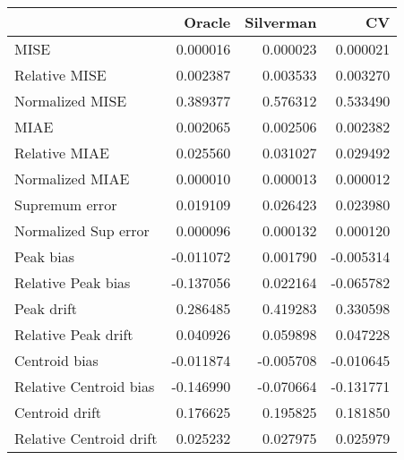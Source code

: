 \begin{tabular}{lrrr}
  \toprule
 & Oracle & Silverman & CV \\ 
  \midrule
MISE & 0.000016 & 0.000023 & 0.000021 \\ 
  Relative MISE & 0.002387 & 0.003533 & 0.003270 \\ 
  Normalized MISE & 0.389377 & 0.576312 & 0.533490 \\ 
  MIAE & 0.002065 & 0.002506 & 0.002382 \\ 
  Relative MIAE & 0.025560 & 0.031027 & 0.029492 \\ 
  Normalized MIAE & 0.000010 & 0.000013 & 0.000012 \\ 
  Supremum error & 0.019109 & 0.026423 & 0.023980 \\ 
  Normalized Sup error & 0.000096 & 0.000132 & 0.000120 \\ 
  Peak bias & -0.011072 & 0.001790 & -0.005314 \\ 
  Relative Peak bias & -0.137056 & 0.022164 & -0.065782 \\ 
  Peak drift & 0.286485 & 0.419283 & 0.330598 \\ 
  Relative Peak drift & 0.040926 & 0.059898 & 0.047228 \\ 
  Centroid bias & -0.011874 & -0.005708 & -0.010645 \\ 
  Relative Centroid bias & -0.146990 & -0.070664 & -0.131771 \\ 
  Centroid drift & 0.176625 & 0.195825 & 0.181850 \\ 
  Relative Centroid drift & 0.025232 & 0.027975 & 0.025979 \\ 
   \bottomrule
\end{tabular}
